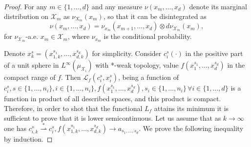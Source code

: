 \documentclass{amsart}
\theoremstyle{remark}
\numberwithin{equation}{section}
\numberwithin{figure}{section}
\def\mX{\mathcal{X}}
\begin{document}
\begin{proof}
	For any $ m \in \{1, \ldots, d\}$ and any measure $\nu(x_m, \ldots, x_d)$ denote its marginal distribution on $\mX_m$ as $\nu_{X_m}(x_m)$, so that it can be disintegrated as
	\[
	\nu(x_m, \ldots, x_d) = \nu_{x_m}(x_{m+1},\ldots, x_{d}) \otimes d\nu_{\mX_m}(x_m), 
	\]
	for $\nu_{\mX_m}$-a.e. $x_m \in \mX_m$, where $\nu_{x_m}$ is the conditional probability. 
	
	Denote $x_k^s = (x_{1, k}^{s_1}, \ldots, x_{d, k}^{s_d})$ for simplicity.
	Consider $c_i^s(\cdot)$ in the positive part of a unit sphere in $L^{\infty} (\mu_{\mX_i})$ with *-weak topology, value $f(x_1^{s_1}, \ldots, x_d^{s_d})$ in the compact range of $f$. Then $\mathcal{L}_f(c_i^s, x_i^s)$, being a function of $c_i^s, s\in \{1, \ldots, n_i\}, i\in \{1, \ldots, n_i\}, f(x_1^{s_1}, \ldots, x_d^{s_d}), s_i \in \{1, \ldots, n_i\}\, \forall i\in\{1,\ldots, d\}$ is a function in product of all described spaces, and this product is compact. Therefore, in order to shot that the functional $L_f$ attains its minimum it is sufficient to prove that it is lower semicontinuous. Let us assume that as $k\to\infty$ one has $c_{i,k}^s\stackrel{\ast}{\rightharpoonup} c_i^s, f(x_{1, k}^{s_1}, \ldots, x_{d, k}^{s_d} ) \to a_{s_{1}, \ldots, s_{d}}$. We prove the following inequality by induction.


\end{proof}
\end{document}
